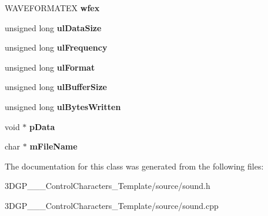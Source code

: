 \begin{DoxyCompactItemize}
W\+A\+V\+E\+F\+O\+R\+M\+A\+T\+EX {\bfseries wfex}
\item 
\mbox{\label{class_s_o_u_n_d_abccb3cdff4440d791c9a2e3fbc77b77c}} 
unsigned long {\bfseries ul\+Data\+Size}
\item 
\mbox{\label{class_s_o_u_n_d_aba5b5324724cb90d8aa3f9d31069ba76}} 
unsigned long {\bfseries ul\+Frequency}
\item 
\mbox{\label{class_s_o_u_n_d_ab9858c7e9e36af3bf8c4d0e76c13718c}} 
unsigned long {\bfseries ul\+Format}
\item 
\mbox{\label{class_s_o_u_n_d_a49925a922bdd7062fc9916fd86254980}} 
unsigned long {\bfseries ul\+Buffer\+Size}
\item 
\mbox{\label{class_s_o_u_n_d_a3af2648bc0569915511860ebebfcd246}} 
unsigned long {\bfseries ul\+Bytes\+Written}
\item 
\mbox{\label{class_s_o_u_n_d_a46832ac27ae2ef80a8696d23a3d7acff}} 
void $\ast$ {\bfseries p\+Data}
\item 
\mbox{\label{class_s_o_u_n_d_a23db6da1d79da30db5f1697d9cbea68b}} 
char $\ast$ {\bfseries m\+File\+Name}
\end{DoxyCompactItemize}


The documentation for this class was generated from the following files\+:\begin{DoxyCompactItemize}
\item 
3\+D\+G\+P\+\_\+\_\+\_\+\+Control\+Characters\+\_\+\+Template/source/sound.\+h\item 
3\+D\+G\+P\+\_\+\_\+\_\+\+Control\+Characters\+\_\+\+Template/source/sound.\+cpp\end{DoxyCompactItemize}
